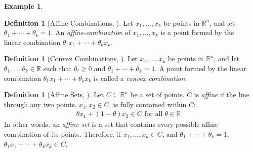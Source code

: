 \documentclass[11pt,reqno]{amsart}
\newcommand{\R}{\mathbb{R}}
\theoremstyle{plain}
\theoremstyle{definition}
\newtheorem{example}[theorem]{Example}
\newtheorem{definition}[theorem]{Definition}
\begin{document}
{\begin{example}
\begin{figure}[h]
\begin{minipage}{.5\textwidth}
      \label{fig:test2}
    \end{minipage}
    \end{figure}
\end{example}
\smallskip
\begin{definition}[{Affine Combinations, \cite[2.1.2]{boyd_vandenberghe_2004}}]
    Let $x_1,\ldots,x_k$ be points in $\R^n$, and let $\theta_1+\cdots+\theta_k=1$. An \emph{affine-combination} of $x_1,\ldots,x_k$ is a point formed by the linear combination $\theta_1x_1+\cdots+\theta_kx_k$.
\end{definition}
\smallskip
\begin{definition}[{Convex Combinations, \cite[2.1.4]{boyd_vandenberghe_2004}}]
    Let $x_1,\ldots,x_k$ be points in $\R^n$, and let $\theta_1,\ldots,\theta_k\in\R$ such that $\theta_i\geq 0$ and $\theta_1+\cdots+\theta_k=1$. A point formed by the linear combination $\theta_1x_1+\cdots+\theta_kx_k$ is called a \emph{convex combination}.
\end{definition}
\smallskip
\begin{definition}[{Affine Sets, \cite[2.1.2]{boyd_vandenberghe_2004}}]
    Let $C \subseteq \R^n$ be a set of points. $C$ is \emph{affine} if the line through any two points, $x_1, x_2 \in C$, is fully contained within $C$:
    \begin{align*}
        \theta x_1 + (1 - \theta)x_2 \in C \text{ for all } \theta\in\R
    \end{align*}
    In other words, an \emph{affine set} is a set that contains every possible affine combination of its points. Therefore, if $x_1,\ldots,x_k\in C$, and $\theta_1+\cdots+\theta_k=1$, $\theta_1x_1+\cdots+\theta_kx_k\in C$.


\end{definition}}
\end{document}
